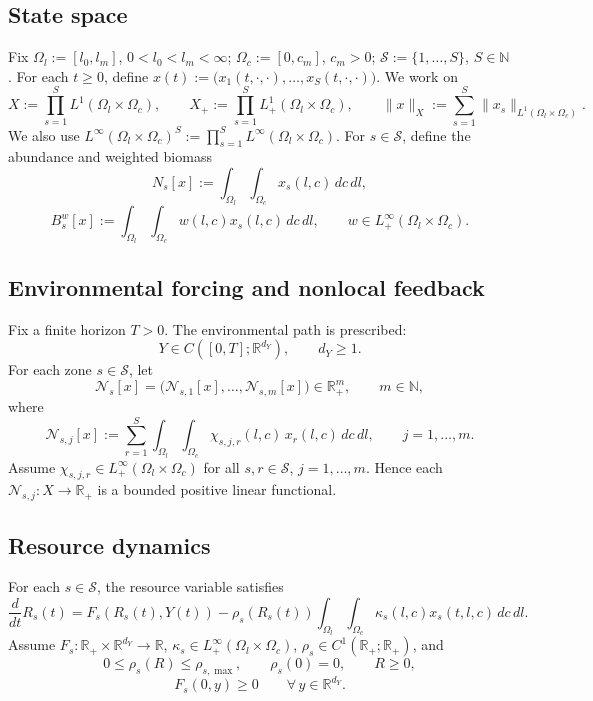 \documentclass[pdflatex,sn-mathphys-num]{sn-jnl}%
\begin{document}
\subsection{State space}
Fix
\(\Omega_l:=[l_0,l_m]\), \(0<l_0<l_m<\infty\);
\(\Omega_c:=[0,c_m]\), \(c_m>0\);
\(\mathcal S:=\{1,\dots,S\}\), \(S\in\mathbb N\).
For each \(t\ge 0\), define
\(x(t):=\big(x_1(t,\cdot,\cdot),\dots,x_S(t,\cdot,\cdot)\big)\).
We work on
\[
X:=\prod_{s=1}^S L^1(\Omega_l\times\Omega_c),
\qquad
X_+:=\prod_{s=1}^S L^1_+(\Omega_l\times\Omega_c),
\qquad
\|x\|_X
:=
\sum_{s=1}^S\|x_s\|_{L^1(\Omega_l\times\Omega_c)}.
\]
We also use
\(L^\infty(\Omega_l\times\Omega_c)^S
:=\prod_{s=1}^S L^\infty(\Omega_l\times\Omega_c)\).
For \(s\in\mathcal S\), define the abundance and weighted biomass
\begin{equation}\label{eq:model_zone_abundance}
N_s[x]
:=
\int_{\Omega_l}\int_{\Omega_c}x_s(l,c)\,dc\,dl,
\end{equation}
\begin{equation}\label{eq:model_zone_biomass}
B_s^w[x]
:=
\int_{\Omega_l}\int_{\Omega_c}w(l,c)x_s(l,c)\,dc\,dl,
\qquad
w\in L^\infty_+(\Omega_l\times\Omega_c).
\end{equation}

\subsection{Environmental forcing and nonlocal feedback}
Fix a finite horizon \(T>0\). The environmental path is prescribed:
\[
Y\in C([0,T];\mathbb R^{d_Y}),
\qquad d_Y\ge 1.
\]
For each zone \(s\in\mathcal S\), let
\[
\mathcal N_s[x]
=
\big(\mathcal N_{s,1}[x],\dots,\mathcal N_{s,m}[x]\big)\in\mathbb R_+^m,
\qquad m\in\mathbb N,
\]
where
\begin{equation}\label{eq:model_nonlocal_components}
\mathcal N_{s,j}[x]
:=
\sum_{r=1}^S
\int_{\Omega_l}\int_{\Omega_c}
\chi_{s,j,r}(l,c)\,x_r(l,c)\,dc\,dl,
\qquad j=1,\dots,m.
\end{equation}
Assume
\(\chi_{s,j,r}\in L^\infty_+(\Omega_l\times\Omega_c)\) for all
\(s,r\in\mathcal S\), \(j=1,\dots,m\).
Hence each \(\mathcal N_{s,j}:X\to\mathbb R_+\) is a bounded positive linear functional.

\subsection{Resource dynamics}
For each \(s\in\mathcal S\), the resource variable satisfies
\begin{equation}\label{eq:model_resource_ode}
\frac{d}{dt}R_s(t)
=
F_s(R_s(t),Y(t))
-
\rho_s(R_s(t))
\int_{\Omega_l}\int_{\Omega_c}
\kappa_s(l,c)x_s(t,l,c)\,dc\,dl.
\end{equation}
Assume
\(F_s:\mathbb R_+\times\mathbb R^{d_Y}\to\mathbb R\),
\(\kappa_s\in L^\infty_+(\Omega_l\times\Omega_c)\),
\(\rho_s\in C^1(\mathbb R_+;\mathbb R_+)\),
and
\begin{equation}\label{eq:model_rho_assumptions}
0\le \rho_s(R)\le \rho_{s,\max},
\qquad
\rho_s(0)=0,
\qquad
R\ge 0,
\end{equation}
\begin{equation}\label{eq:model_F_nonnegativity}
F_s(0,y)\ge 0
\qquad
\forall\,y\in\mathbb R^{d_Y}.
\end{equation}
\end{document}
